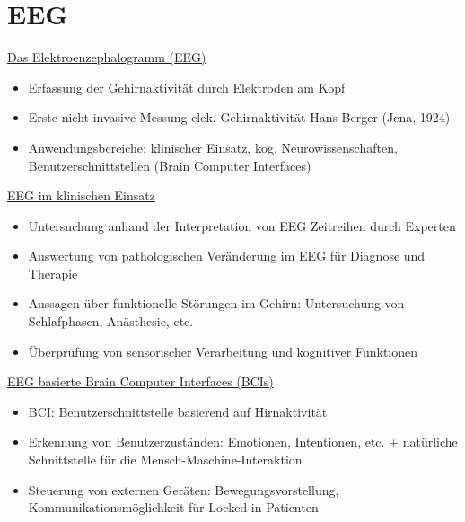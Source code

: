 \documentclass[a4paper,10pt,oneside]{article}
\begin{document}
 		
\section{EEG}
\underline{Das Elektroenzephalogramm (EEG)} \\
	\begin{itemize}
		\item Erfassung der Gehirnaktivität durch Elektroden am Kopf 
		\item Erste nicht-invasive Messung elek. Gehirnaktivität Hans Berger (Jena, 1924)
		\item Anwendungsbereiche: klinischer Einsatz, kog. Neurowissenschaften, Benutzerschnittstellen (Brain Computer Interfaces)
	\end{itemize}
	
\underline{EEG im klinischen Einsatz} \\
	\begin{itemize}
		\item Untersuchung anhand der Interpretation von EEG Zeitreihen durch Experten
		\item Auswertung von pathologischen Veränderung im EEG für Diagnose und Therapie
		\item Aussagen über funktionelle Störungen im Gehirn: Untersuchung von Schlafphasen, Anästhesie, etc. 
		\item Überprüfung von sensorischer Verarbeitung und kognitiver Funktionen
	\end{itemize}


\underline{EEG basierte Brain Computer Interfaces (BCIs)} \\	
	\begin{itemize}
		\item BCI: Benutzerschnittstelle basierend auf Hirnaktivität
		\item Erkennung von Benutzerzuständen: Emotionen, Intentionen, etc. + natürliche Schnittstelle für die Mensch-Maschine-Interaktion
		\item Steuerung von externen Geräten: Bewegungsvorstellung, Kommunikationsmöglichkeit für Locked-in Patienten
	\end{itemize}		
	
\end{document}
